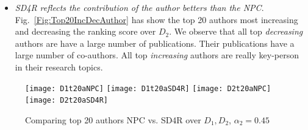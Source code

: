 \documentclass[10pt,leqno,twoside]{article}
\begin{document}
\begin{itemize}
\item\textit{SD4R reflects the contribution of the author betters than the NPC}. Fig.~\ref{Fig:Top20IncDecAuthor} has show the top 20 authors most increasing and decreasing the ranking score over $D_2$. We observe that all top \textit{decreasing} authors are have a large number of publications. Their publications have a large number of co-authors. All top \textit{increasing} authors are really key-person in their research topics.
\end{itemize}
%
\begin{figure} %
	\caption{Comparing top 20 authors NPC vs. SD4R over $D_1, D_2$, $\alpha_2=0.45$}
	\label{Fig:Top20Author}
    \centering
    \texttt{[image: D1t20aNPC]}    
    \texttt{[image: D1t20aSD4R]}
    \texttt{[image: D2t20aNPC]}  
    \texttt{[image: D2t20aSD4R]}
\end{figure}
%

%
\end{document}
